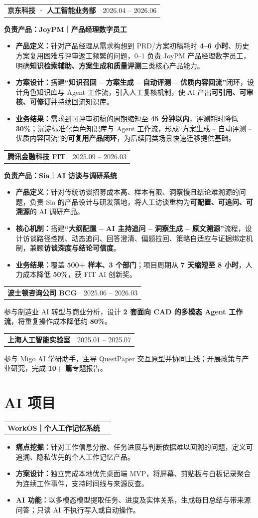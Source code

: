\documentclass[9pt,a4paper]{article}
\makeatletter
\newcommand{\entryheading}[3]{%
  \begin{tabularx}{\textwidth}{@{}X r@{}}
    {\fontsize{10.4}{12.4}\selectfont\textbf{#1}}\hspace{0.48em}{\fontsize{9.55}{11.6}\selectfont\color{textgray}#2} &
    {\fontsize{9.45}{11.4}\selectfont\color{textgray}#3} \\
  \end{tabularx}\vspace{0.09em}
}
\newcommand{\projectname}[1]{%
  {\fontsize{9.9}{11.9}\selectfont\textbf{#1}}\par\vspace{0.06em}
}
\newcommand{\tagitem}[2]{\item \textbf{#1：}#2}
\newcommand{\internshipgap}{\vspace{0.16em}}
\makeatother
\begin{document}
\entryheading{京东科技 · 人工智能业务部}{AI 产品经理}{2026.04 -- 2026.06}
\projectname{负责产品：JoyPM｜产品经理数字员工}
\begin{itemize}
  \tagitem{产品定义}{针对产品经理从需求构想到 PRD/方案初稿耗时 \textbf{4--6 小时}、历史方案复用困难与评审返工频繁的问题，0--1 负责 JoyPM 产品经理数字员工，明确\textbf{知识检索辅助、方案生成和质量评测}三类核心产品能力。}
  \tagitem{方案设计}{搭建\textbf{“知识召回 -- 方案生成 -- 自动评测 -- 优质内容回流”}闭环，设计角色知识库与 Agent 工作流，引入人工复核机制，使 AI 产出\textbf{可引用、可审核、可修订}并持续回流知识库。}
  \tagitem{业务结果}{需求到可评审初稿的周期缩短至 \textbf{45 分钟以内}，评测耗时降低 \textbf{30\%}；沉淀标准化角色知识库与 Agent 工作流，形成“方案生成 -- 自动评测 -- 优质内容回流”的\textbf{可复用产品闭环}，为后续同类场景快速迁移提供基础。}
\end{itemize}
\internshipgap

\entryheading{腾讯金融科技 FIT}{AI 产品经理}{2025.09 -- 2026.03}
\projectname{负责产品：Sia｜AI 访谈与调研系统}
\begin{itemize}
  \tagitem{产品定义}{针对传统访谈招募成本高、样本有限、洞察慢且结论难溯源的问题，负责 Sia 的产品设计与研发落地，将人工访谈重构为\textbf{可配置、可追问、可溯源}的 AI 调研产品。}
  \tagitem{核心机制}{搭建\textbf{“大纲配置 -- AI 主持追问 -- 洞察生成 -- 原文溯源”}流程，设计访谈路径控制、动态追问、回答澄清、偏题拉回、策略自适应与证据绑定机制，兼顾\textbf{访谈深度与结论可信度}。}
  \tagitem{业务结果}{覆盖 \textbf{500+ 样本、3 个部门}；项目周期从 \textbf{7 天缩短至 8 小时}，人力成本降低 \textbf{50\%}，获 FIT AI 创新奖。}
\end{itemize}
\internshipgap

\entryheading{波士顿咨询公司 BCG}{项目助理}{2025.06 -- 2026.03}
参与制造业 AI 转型与商业分析，设计 \textbf{2 套面向 CAD 的多模态 Agent 工作流}，将重复操作成本降低约 \textbf{80\%}。\par\vspace{0.22em}

\entryheading{上海人工智能实验室}{战略与 AI 应用实习生}{2025.01 -- 2025.07}
参与 Migo AI 学研助手，主导 QuestPaper 交互原型并协同上线；开展政策与产业研究，完成 \textbf{10+ 篇}专题报告。\par\vspace{0.16em}

\section{AI 项目}
\entryheading{WorkOS｜个人工作记忆系统}{个人项目}{}
\begin{itemize}
  \tagitem{痛点挖掘}{针对工作信息分散、任务进展与判断依据难以回溯的问题，定义可追溯、隐私优先的个人工作记忆产品。}
  \tagitem{方案设计}{独立完成本地优先桌面端 MVP，将屏幕、剪贴板与白板记录聚合为连续工作事件，支持时间线与来源反查。}
  \tagitem{AI 功能}{以多模态模型提取任务、进度及实体关系，生成每日总结与带来源问答；只读 AI 不执行写入或自动操作。}
\end{itemize}
\end{document}
